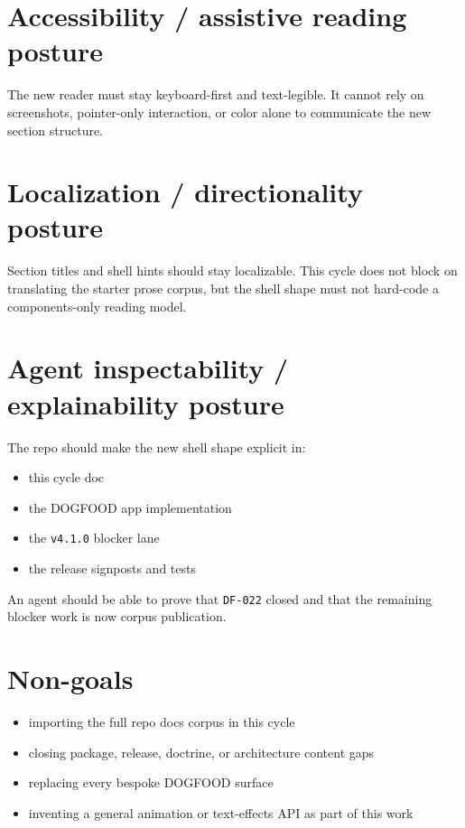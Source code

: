 \section{Accessibility / assistive reading posture}\label{record-083-accessibility-assistive-reading-posture}

The new reader must stay keyboard-first and text-legible. It cannot rely on screenshots, pointer-only interaction, or color alone to communicate the new section structure.

\section{Localization / directionality posture}\label{record-083-localization-directionality-posture}

Section titles and shell hints should stay localizable. This cycle does not block on translating the starter prose corpus, but the shell shape must not hard-code a components-only reading model.

\section{Agent inspectability / explainability posture}\label{record-083-agent-inspectability-explainability-posture}

The repo should make the new shell shape explicit in:

\begin{itemize}
\tightlist
\item
  this cycle doc
\item
  the DOGFOOD app implementation
\item
  the \texttt{v\allowbreak{}4\allowbreak{}.\allowbreak{}1\allowbreak{}.\allowbreak{}0} blocker lane
\item
  the release signposts and tests
\end{itemize}

An agent should be able to prove that \texttt{D\allowbreak{}F\allowbreak{}-\allowbreak{}0\allowbreak{}2\allowbreak{}2} closed and that the remaining blocker work is now corpus publication.

\section{Non-goals}\label{record-083-non-goals}

\begin{itemize}
\tightlist
\item
  importing the full repo docs corpus in this cycle
\item
  closing package, release, doctrine, or architecture content gaps
\item
  replacing every bespoke DOGFOOD surface
\item
  inventing a general animation or text-effects API as part of this work
\end{itemize}


